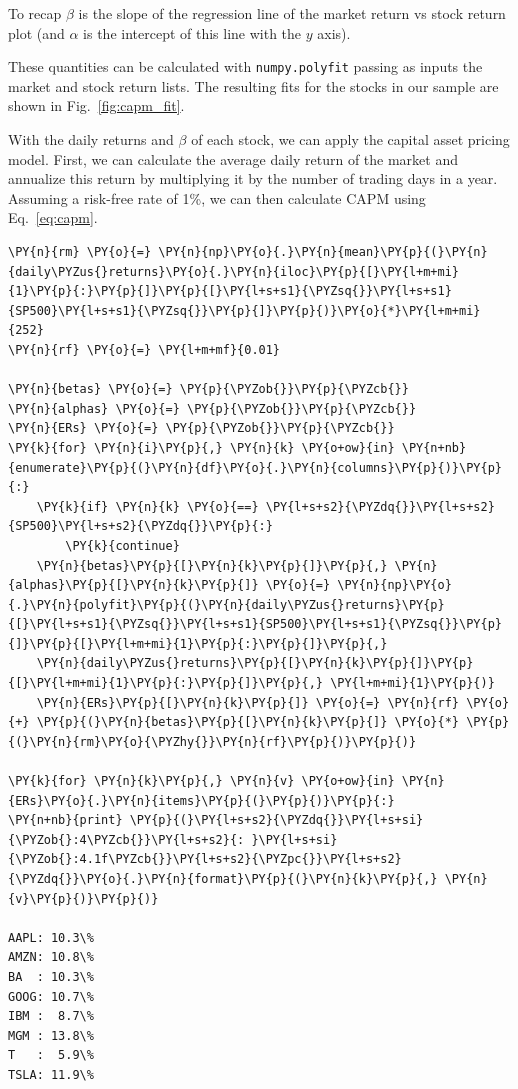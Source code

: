 To recap $\beta$ is the slope of the regression line of the market return vs stock return plot (and $\alpha$ is the intercept of this line with the $y$ axis).

These quantities can be calculated with \texttt{numpy.polyfit} passing as inputs the market and stock return lists. 
The resulting fits for the stocks in our sample are shown in Fig.~\ref{fig:capm_fit}.

With the daily returns and $\beta$ of each stock, we can apply the capital asset pricing model. First, we can calculate the average daily return of the market and annualize this return by multiplying it by the number of trading days in a year.
Assuming a risk-free rate of 1\%, we can then calculate CAPM using Eq.~\ref{eq:capm}.

\begin{tcolorbox}[breakable, size=fbox, boxrule=1pt, pad at break*=1mm,colback=cellbackground, colframe=cellborder]
\begin{Verbatim}[commandchars=\\\{\}]
\PY{n}{rm} \PY{o}{=} \PY{n}{np}\PY{o}{.}\PY{n}{mean}\PY{p}{(}\PY{n}{daily\PYZus{}returns}\PY{o}{.}\PY{n}{iloc}\PY{p}{[}\PY{l+m+mi}{1}\PY{p}{:}\PY{p}{]}\PY{p}{[}\PY{l+s+s1}{\PYZsq{}}\PY{l+s+s1}{SP500}\PY{l+s+s1}{\PYZsq{}}\PY{p}{]}\PY{p}{)}\PY{o}{*}\PY{l+m+mi}{252}
\PY{n}{rf} \PY{o}{=} \PY{l+m+mf}{0.01} 
	
\PY{n}{betas} \PY{o}{=} \PY{p}{\PYZob{}}\PY{p}{\PYZcb{}}
\PY{n}{alphas} \PY{o}{=} \PY{p}{\PYZob{}}\PY{p}{\PYZcb{}}
\PY{n}{ERs} \PY{o}{=} \PY{p}{\PYZob{}}\PY{p}{\PYZcb{}}
\PY{k}{for} \PY{n}{i}\PY{p}{,} \PY{n}{k} \PY{o+ow}{in} \PY{n+nb}{enumerate}\PY{p}{(}\PY{n}{df}\PY{o}{.}\PY{n}{columns}\PY{p}{)}\PY{p}{:}
    \PY{k}{if} \PY{n}{k} \PY{o}{==} \PY{l+s+s2}{\PYZdq{}}\PY{l+s+s2}{SP500}\PY{l+s+s2}{\PYZdq{}}\PY{p}{:}
        \PY{k}{continue}
    \PY{n}{betas}\PY{p}{[}\PY{n}{k}\PY{p}{]}\PY{p}{,} \PY{n}{alphas}\PY{p}{[}\PY{n}{k}\PY{p}{]} \PY{o}{=} \PY{n}{np}\PY{o}{.}\PY{n}{polyfit}\PY{p}{(}\PY{n}{daily\PYZus{}returns}\PY{p}{[}\PY{l+s+s1}{\PYZsq{}}\PY{l+s+s1}{SP500}\PY{l+s+s1}{\PYZsq{}}\PY{p}{]}\PY{p}{[}\PY{l+m+mi}{1}\PY{p}{:}\PY{p}{]}\PY{p}{,} 
    \PY{n}{daily\PYZus{}returns}\PY{p}{[}\PY{n}{k}\PY{p}{]}\PY{p}{[}\PY{l+m+mi}{1}\PY{p}{:}\PY{p}{]}\PY{p}{,} \PY{l+m+mi}{1}\PY{p}{)}
    \PY{n}{ERs}\PY{p}{[}\PY{n}{k}\PY{p}{]} \PY{o}{=} \PY{n}{rf} \PY{o}{+} \PY{p}{(}\PY{n}{betas}\PY{p}{[}\PY{n}{k}\PY{p}{]} \PY{o}{*} \PY{p}{(}\PY{n}{rm}\PY{o}{\PYZhy{}}\PY{n}{rf}\PY{p}{)}\PY{p}{)} 

\PY{k}{for} \PY{n}{k}\PY{p}{,} \PY{n}{v} \PY{o+ow}{in} \PY{n}{ERs}\PY{o}{.}\PY{n}{items}\PY{p}{(}\PY{p}{)}\PY{p}{:} 
\PY{n+nb}{print} \PY{p}{(}\PY{l+s+s2}{\PYZdq{}}\PY{l+s+si}{\PYZob{}:4\PYZcb{}}\PY{l+s+s2}{: }\PY{l+s+si}{\PYZob{}:4.1f\PYZcb{}}\PY{l+s+s2}{\PYZpc{}}\PY{l+s+s2}{\PYZdq{}}\PY{o}{.}\PY{n}{format}\PY{p}{(}\PY{n}{k}\PY{p}{,} \PY{n}{v}\PY{p}{)}\PY{p}{)}

AAPL: 10.3\%
AMZN: 10.8\%
BA  : 10.3\%
GOOG: 10.7\%
IBM :  8.7\%
MGM : 13.8\%
T   :  5.9\%
TSLA: 11.9\%
\end{Verbatim}
\end{tcolorbox}


